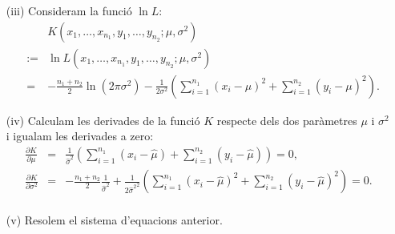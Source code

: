 {\begin{itemize}
\begin{itemize}
	\item[(iii)] Consideram la funci\'o $\ln L$:
\begin{eqnarray*}
	& & K  (x_1,\ldots,x_{n_1},y_1,\ldots,y_{n_2};\mu,\sigma^2) 
	\\ & := & \ln L 
	(x_1,\ldots,x_{n_1},y_1,\ldots,y_{n_2};\mu,\sigma^2) 
	\\  & = & -\frac{n_1 +n_2}{2}\ln (2\pi \sigma^2) 
	-\frac{1}{2\sigma^2}\left(\sum\limits_{i=1}^{n_1} {(x_i -\mu)}^2
	+\sum\limits_{i=1}^{n_2} {(y_i -\mu)}^2\right).
\end{eqnarray*}
	
	\item[(iv)] Calculam les derivades de la funci\'o $K$ respecte dels dos 
	par\`ametres $\mu$ i $\sigma^2$ i igualam les 
	derivades a zero:
	\begin{eqnarray}
		\frac{\partial K}{\partial \mu} & = & 
		\frac{1}{\hat{\sigma}^2}\left( \sum_{i=1}^{n_1} (x_i -\hat{\mu}) +
		\sum_{i=1}^{n_2} (y_i -\hat{\mu})\right) =0, 
		\label{MU12}\\
		\frac{\partial K}{\partial \sigma^2} & = & 
		-\frac{n_1 +n_2}{2}\frac{1}{\hat{\sigma}^2} 
		+\frac{1}{2{\hat{\sigma}^2 {}}^2} \left(\sum_{i=1}^{n_1} {(x_i-\hat{\mu})}^2 
		+ \sum_{i=1}^{n_2} {(y_i-\hat{\mu})}^2 \right)
		= 0. \nonumber \\ \label{SIGMA12}
	\end{eqnarray}
	
	\item[(v)] Resolem el sistema d'equacions anterior. 
	

\end{itemize}
\end{itemize}}
